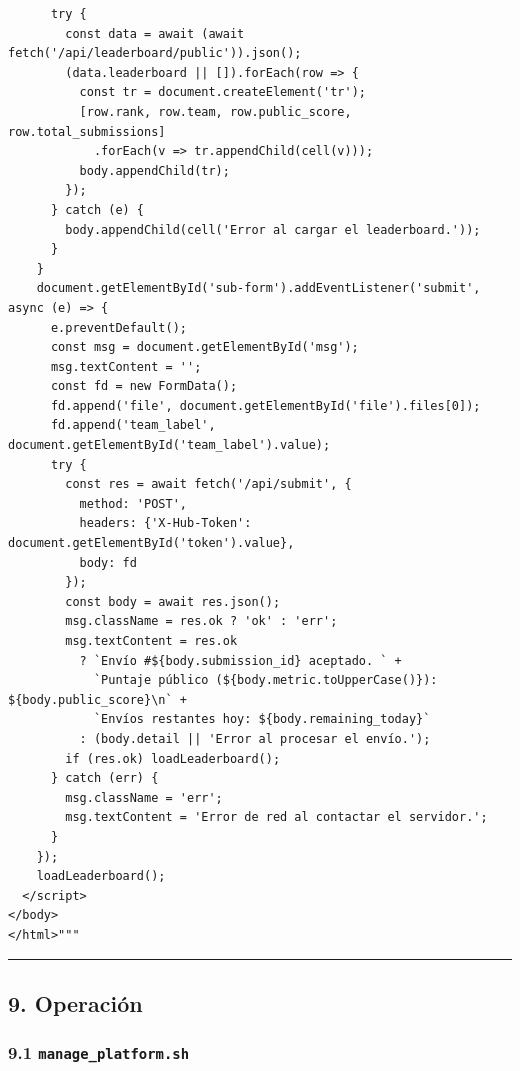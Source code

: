 \documentclass[11pt,a4paper]{article}
\begin{document}
\begin{lstlisting}
      try {
        const data = await (await fetch('/api/leaderboard/public')).json();
        (data.leaderboard || []).forEach(row => {
          const tr = document.createElement('tr');
          [row.rank, row.team, row.public_score, row.total_submissions]
            .forEach(v => tr.appendChild(cell(v)));
          body.appendChild(tr);
        });
      } catch (e) {
        body.appendChild(cell('Error al cargar el leaderboard.'));
      }
    }
    document.getElementById('sub-form').addEventListener('submit', async (e) => {
      e.preventDefault();
      const msg = document.getElementById('msg');
      msg.textContent = '';
      const fd = new FormData();
      fd.append('file', document.getElementById('file').files[0]);
      fd.append('team_label', document.getElementById('team_label').value);
      try {
        const res = await fetch('/api/submit', {
          method: 'POST',
          headers: {'X-Hub-Token': document.getElementById('token').value},
          body: fd
        });
        const body = await res.json();
        msg.className = res.ok ? 'ok' : 'err';
        msg.textContent = res.ok
          ? `Envío #${body.submission_id} aceptado. ` +
            `Puntaje público (${body.metric.toUpperCase()}): ${body.public_score}\n` +
            `Envíos restantes hoy: ${body.remaining_today}`
          : (body.detail || 'Error al procesar el envío.');
        if (res.ok) loadLeaderboard();
      } catch (err) {
        msg.className = 'err';
        msg.textContent = 'Error de red al contactar el servidor.';
      }
    });
    loadLeaderboard();
  </script>
</body>
</html>"""
\end{lstlisting}

\begin{center}\rule{0.5\linewidth}{0.5pt}\end{center}

\hypertarget{9-operaciuxf3n}{%
\subsection{9. Operación}\label{9-operaciuxf3n}}

\hypertarget{91-manage_platformsh}{%
\subsubsection{\texorpdfstring{9.1 \texttt{manage\_\allowbreak{}platform.\allowbreak{}sh}}{9.1 manage\_platform.sh}}\label{91-manage_platformsh}}
\end{document}
